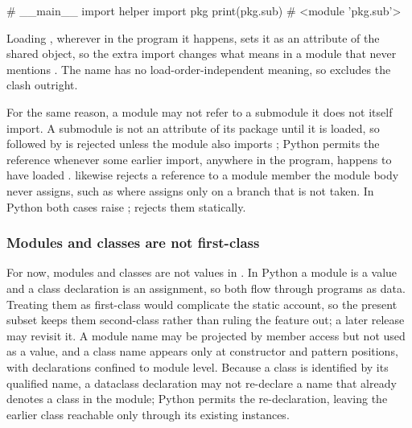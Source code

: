 \begin{center}
\begin{minipage}[t]{0.55\textwidth}
\begin{python}
# __main__
import helper
import pkg
print(pkg.sub)  # <module 'pkg.sub'>
\end{python}
\end{minipage}
\end{center}

Loading , wherever in the program it happens, sets it as an attribute of the shared
 object, so the extra import changes what  means in a module that never
mentions . The name has no load-order-independent meaning, so \PurePy excludes the clash
outright.

For the same reason, a module may not refer to a submodule it does not itself import. A submodule is not an
attribute of its package until it is loaded, so  followed by  is rejected
unless the module also imports ; Python permits the reference whenever some earlier import,
anywhere in the program, happens to have loaded . \PurePy likewise rejects a reference to a
module member the module body never assigns, such as  where  assigns
 only on a branch that is not taken. In Python both cases raise ; \PurePy
rejects them statically.

\subsubsection{Modules and classes are not first-class}
\label{sec:no-first-class}

For now, modules and classes are not values in \PurePy. In Python a module is a value and a class declaration
is an assignment, so both flow through programs as data. Treating them as first-class would complicate the
static account, so the present subset keeps them second-class rather than ruling the feature out; a later
release may revisit it. A module name may be projected by member access but not used as a value, and a class
name appears only at constructor and pattern positions, with declarations confined to module level. Because a
class is identified by its qualified name, a dataclass declaration may not re-declare a name that already
denotes a class in the module; Python permits the re-declaration, leaving the earlier class reachable only
through its existing instances.

